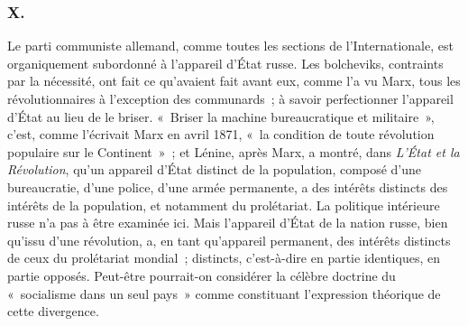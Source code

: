 \documentclass[french,twoside]{book} %
\begin{document}
\subsubsection[{X.}]{X.}
\noindent Le parti communiste allemand, comme toutes les sections de l'Internatio­nale, est organiquement subordonné à l'appareil d'État russe. Les bolcheviks, contraints par la nécessité, ont fait ce qu'avaient fait avant eux, comme l'a vu Marx, tous les révolutionnaires à l'exception des communards ; à savoir per­fectionner l'appareil d'État au lieu de le briser. « Briser la machine bureau­cratique et militaire », c'est, comme l'écrivait Marx en avril 1871, « la condition de toute révolution populaire sur le Continent » ; et Lénine, après Marx, a montré, dans {\itshape L'État et la Révolution}, qu'un appareil d'État distinct de la population, composé d'une bureaucratie, d'une police, d'une armée perma­nente, a des intérêts distincts des intérêts de la population, et notamment du prolétariat. La politique intérieure russe n'a pas à être examinée ici. Mais l'appareil d'État de la nation russe, bien qu'issu d'une révolution, a, en tant qu'appareil permanent, des intérêts distincts de ceux du prolétariat mondial ; distincts, c'est-à-dire en partie identiques, en partie opposés. Peut-être pourrait-on considérer la célèbre doctrine du « socialisme dans un seul pays » comme constituant l'expression théorique de cette divergence.\par
\end{document}
